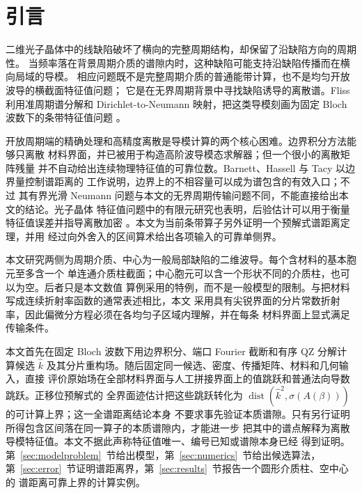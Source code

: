 \section{引言}
\label{sec:introduction}

二维光子晶体中的线缺陷破坏了横向的完整周期结构，却保留了沿缺陷方向的周期性。
当频率落在背景周期介质的谱隙内时，这种缺陷可能支持沿缺陷传播而在横向局域的导模。
相应问题既不是完整周期介质的普通能带计算，也不是均匀开放波导的横截面特征值问题；
它是在无界周期背景中寻找缺陷诱导的离散谱。Fliss 利用准周期谱分解和
Dirichlet-to-Neumann 映射，把这类导模刻画为固定 Bloch 波数下的条带特征值问题
\cite{Fliss2013}。

开放周期端的精确处理和高精度离散是导模计算的两个核心困难。边界积分方法能够只离散
材料界面，并已被用于构造高阶波导模态求解器\cite{LuLu2014}；但一个很小的离散矩阵残量
并不自动给出连续物理特征值的可靠位数。Barnett、Hassell 与 Tacy 以边界量控制谱距离的
工作说明，边界上的不相容量可以成为谱包含的有效入口\cite{BarnettHassellTacy2018}；不过
其有界光滑 Neumann 问题与本文的无界周期传输问题不同，不能直接给出本文的结论。光子晶体
特征值问题中的有限元研究也表明，后验估计可以用于衡量特征值误差并指导离散加密
\cite{EngstromGianiGrubisic2016}。本文为当前条带算子另外证明一个预解式谱距离定理，并用
经过向外舍入的区间算术给出各项输入的可靠单侧界。

本文研究两侧为周期介质、中心为一般局部缺陷的二维波导。每个含材料的基本胞元至多含一个
单连通介质柱截面；中心胞元可以含一个形状不同的介质柱，也可以为空。后者只是本文数值
算例采用的特例，而不是一般模型的限制。与把材料写成连续折射率函数的通常表述相比，本文
采用具有尖锐界面的分片常数折射率，因此偏微分方程必须在各均匀子区域内理解，并在每条
材料界面上显式满足传输条件。

本文首先在固定 Bloch 波数下用边界积分、端口 Fourier 截断和有序 QZ 分解计算候选
$\widehat k$ 及其分片重构场。随后固定同一候选、密度、传播矩阵、材料和几何输入，直接
评价原始场在全部材料界面与人工拼接界面上的值跳跃和普通法向导数跳跃。正移位预解式的
全界面迹估计把这些跳跃转化为
$\operatorname{dist}(\widehat k^2,\sigma(A(\beta)))$ 的可计算上界；这一全谱距离结论本身
不要求事先验证本质谱隙。只有另行证明所得包含区间落在同一算子的本质谱隙内，才能进一步
把其中的谱点解释为离散导模特征值。本文不据此声称特征值唯一、编号已知或谱隙本身已经
得到证明。第~\ref{sec:modelproblem}~节给出模型，第~\ref{sec:numerics}~节给出候选算法，
第~\ref{sec:error}~节证明谱距离界，第~\ref{sec:results}~节报告一个圆形介质柱、空中心的
谱距离可靠上界的计算实例。
